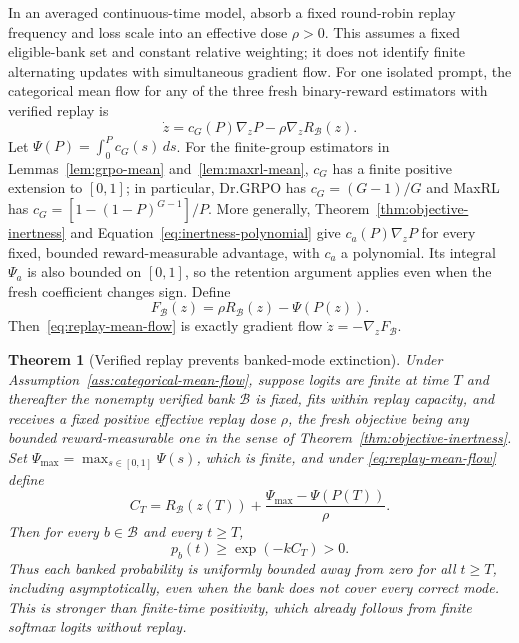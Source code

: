 \documentclass{article}
\newcommand{\enforcehalffinalproseline}{%
  \setlength{\parfillskip}{0pt plus .20\linewidth}}
\newcommand{\1}{\mathbf 1}
\newtheorem{theorem}[lemma]{Theorem}
\theoremstyle{remark}
\theoremstyle{definition}
\theoremstyle{plain}
\begin{document}
In an averaged continuous-time model, absorb a fixed round-robin replay
frequency and loss scale into an effective dose $\rho>0$. This assumes a
fixed eligible-bank set and constant relative weighting; it does not identify
finite alternating updates with simultaneous gradient flow. For one
isolated prompt, the categorical mean flow for any of the three fresh
binary-reward estimators with verified replay is
\begin{equation}
  \dot z
  =c_G(P)\nabla_zP-\rho\nabla_zR_{\mathcal B}(z).
  \label{eq:replay-mean-flow}
\end{equation}
Let $\Psi(P)=\int_0^P c_G(s)\,ds$. For the finite-group estimators in Lemmas~\ref{lem:grpo-mean}
and~\ref{lem:maxrl-mean}, $c_G$ has a finite positive extension to $[0,1]$;
in particular, Dr.GRPO has $c_G=(G-1)/G$ and MaxRL has
$c_G=[1-(1-P)^{G-1}]/P$. More generally, Theorem~\ref{thm:objective-inertness} and
Equation~\eqref{eq:inertness-polynomial} give
$c_a(P)\nabla_zP$ for every fixed, bounded reward-measurable advantage,
with $c_a$ a polynomial. Its integral $\Psi_a$ is also bounded on $[0,1]$,
so the retention argument applies even when the fresh coefficient changes
sign. Define
\begin{equation}
  F_{\mathcal B}(z)=\rho R_{\mathcal B}(z)-\Psi(P(z)).
  \label{eq:replay-potential}
\end{equation}
Then~\eqref{eq:replay-mean-flow} is exactly gradient flow
$\dot z=-\nabla_zF_{\mathcal B}$.

\begin{theorem}[Verified replay prevents banked-mode extinction]
\enforcehalffinalproseline
\label{thm:replay-retention}
Under Assumption~\ref{ass:categorical-mean-flow}, suppose logits are finite
at time $T$ and thereafter the nonempty verified bank $\mathcal B$ is fixed,
fits within replay capacity, and receives a
fixed positive effective replay dose $\rho$, the fresh objective being any
bounded reward-measurable one in the sense of
Theorem~\ref{thm:objective-inertness}. Set
$\Psi_{\max}=\max_{s\in[0,1]}\Psi(s)$, which is finite, and under
\eqref{eq:replay-mean-flow} define
\[
  C_T
  =R_{\mathcal B}(z(T))
   +\frac{\Psi_{\max}-\Psi(P(T))}{\rho}.
\]
Then for every $b\in\mathcal B$ and every $t\ge T$,
\begin{equation}
  p_b(t)\ge \exp(-kC_T)>0.
  \label{eq:replay-retention-bound}
\end{equation}
Thus each banked probability is uniformly bounded away from zero for all
$t\ge T$, including asymptotically, even when the bank does not cover every
correct mode. This is stronger than finite-time positivity, which already
follows from finite softmax logits without replay.
\end{theorem}
\end{document}
